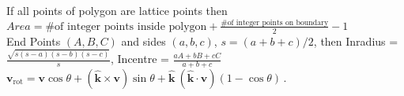  
 If all points of polygon are lattice points then $Area = \text{\# of integer points inside polygon} + \frac{\text{\# of integer points on boundary}}{2} -1$ \\
 End Points $(A,B,C)$ and sides $(a,b,c)$, $s=(a+b+c)/2$, then Inradius = $\frac{\sqrt{s(s-a)(s-b)(s-c)}}{s}$, Incentre = $\frac{aA+bB+cC}{a+b+c}$ \\

 $\mathbf{v}_\mathrm{rot} = \mathbf{v} \cos\theta + (\mathbf{\hat{k}} \times \mathbf{v})\sin\theta + \mathbf{\hat{k}} ~(\mathbf{\hat{k}} \cdot \mathbf{v}) (1 - \cos\theta)\,.$